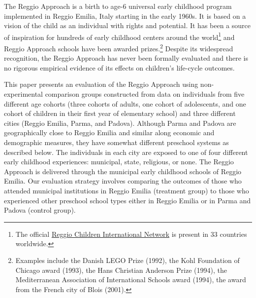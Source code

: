 The Reggio Approach is a birth to age-6 universal early childhood program implemented in Reggio Emilia, Italy starting in the early 1960s. It is based on a vision of the child as an individual with rights and potential. It has been a source of inspiration for hundreds of early childhood centers around the world\footnote{The official \href{http://www.reggiochildren.it/network/?lang=en}{Reggio Children International Network} is present in 33 countries worldwide.} and Reggio Approach schools have been awarded prizes.\footnote{Examples include the Danish LEGO Prize (1992), the Kohl Foundation of Chicago award (1993), the Hans Christian Anderson Prize (1994), the Mediterranean Association of International Schools award (1994), the award from the French city of Blois (2001).} Despite its widespread recognition, the Reggio Approach has never been formally evaluated and there is no rigorous empirical evidence of its effects on children's life-cycle outcomes.

This paper presents an evaluation of the Reggio Approach using non-experimental comparison groups constructed from data on individuals from five different age cohorts (three cohorts of adults, one cohort of adolescents, and one cohort of children in their first year of elementary school) and three different cities (Reggio Emilia, Parma, and Padova). Although Parma and Padova are geographically close to Reggio Emilia and similar along economic and demographic measures, they have somewhat different preschool systems as described below. The individuals in each city are exposed to one of four different early childhood experiences: municipal, state, religious, or none. The Reggio Approach is delivered through the municipal early childhood schools of Reggio Emilia. Our evaluation strategy involves comparing the outcomes of those who attended municipal institutions in Reggio Emilia (treatment group) to those who experienced other preschool school types either in Reggio Emilia or in Parma and Padova (control group).


